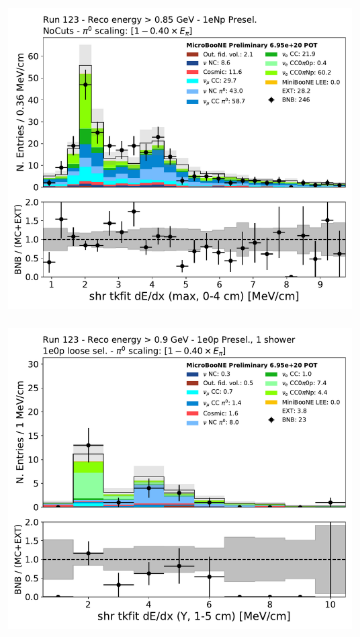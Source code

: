 \begin{figure}[H] 
\begin{center}
    \begin{subfigure}[b]{0.3\textwidth}
    \centering
    \includegraphics[width=1.00\textwidth]{egamma/shr_tkfit_dedx_max_run123_trkpid_lt_m01_tkshdistance_10cm.pdf}
    \caption{\label{fig:datamccomparisons:nuepresel} \zpsel \dedx}
    \end{subfigure}
    \begin{subfigure}[b]{0.3\textwidth}
    \centering
    \includegraphics[width=1.00\textwidth]{1e0p/High_E_Sideband/loose_selection/shr_tkfit_gap10_dedx_Y.pdf}

\end{subfigure}
\end{center}
\end{figure}
